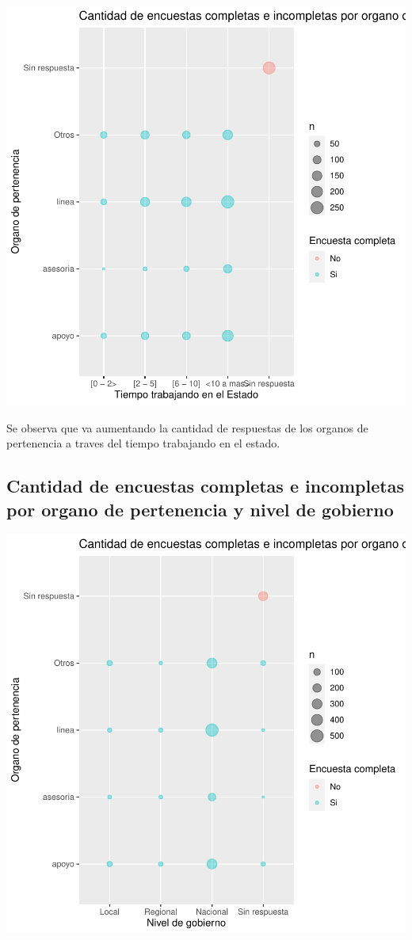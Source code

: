 \documentclass{article}
\begin{document}
\includegraphics{seguimientov3-061}

Se observa que va aumentando la cantidad de respuestas de los organos de pertenencia a traves del tiempo trabajando en el estado.

\subsection{Cantidad de encuestas completas e incompletas por organo de pertenencia y nivel de gobierno}

\includegraphics{seguimientov3-062}
\end{document}
